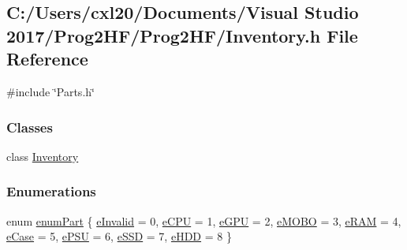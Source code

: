 \subsection{C\+:/\+Users/cxl20/\+Documents/\+Visual Studio 2017/\+Prog2\+H\+F/\+Prog2\+H\+F/\+Inventory.h File Reference}
\label{_inventory_8h}
{\ttfamily \#include \char`\"{}Parts.\+h\char`\"{}}\newline
\subsubsection*{Classes}
\begin{DoxyCompactItemize}
\item 
class \mbox{\hyperlink{class_inventory}{Inventory}}
\end{DoxyCompactItemize}
\subsubsection*{Enumerations}
\begin{DoxyCompactItemize}
\item 
enum \mbox{\hyperlink{_inventory_8h_abddff37837f171d72a2e16a1448a3943}{enum\+Part}} \{ \newline
\mbox{\hyperlink{_inventory_8h_abddff37837f171d72a2e16a1448a3943ab32c771bb60dc8b502f65b81eef3bd86}{e\+Invalid}} = 0, 
\mbox{\hyperlink{_inventory_8h_abddff37837f171d72a2e16a1448a3943af628daad5f03c68213c8181eb59bd178}{e\+C\+PU}} = 1, 
\mbox{\hyperlink{_inventory_8h_abddff37837f171d72a2e16a1448a3943a3a32d863321d2f2062b46d9dd968b7f7}{e\+G\+PU}} = 2, 
\mbox{\hyperlink{_inventory_8h_abddff37837f171d72a2e16a1448a3943a648a218f2851134fdbddf38c73009cbe}{e\+M\+O\+BO}} = 3, 
\newline
\mbox{\hyperlink{_inventory_8h_abddff37837f171d72a2e16a1448a3943ab8ed3ffb829052bad316bc5bd3563c95}{e\+R\+AM}} = 4, 
\mbox{\hyperlink{_inventory_8h_abddff37837f171d72a2e16a1448a3943a7a9e0a3b7edbb259ac104bcdcc146687}{e\+Case}} = 5, 
\mbox{\hyperlink{_inventory_8h_abddff37837f171d72a2e16a1448a3943a1e9e01992a9c1cfae96b1bf60b946beb}{e\+P\+SU}} = 6, 
\mbox{\hyperlink{_inventory_8h_abddff37837f171d72a2e16a1448a3943a47cf1e8f84e82a65f9ecb6d21649b4b4}{e\+S\+SD}} = 7, 
\newline
\mbox{\hyperlink{_inventory_8h_abddff37837f171d72a2e16a1448a3943a28b188092ec14a7f857b6b0a63185683}{e\+H\+DD}} = 8
 \}
\end{DoxyCompactItemize}

